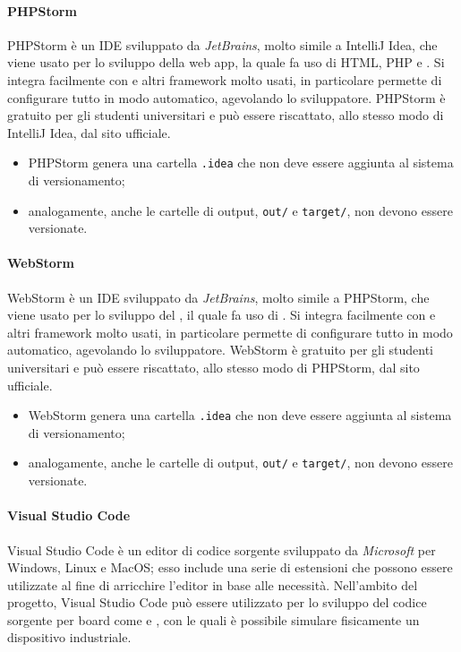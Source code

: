 				\paragraph{PHPStorm}
					PHPStorm è un IDE sviluppato da \textit{JetBrains}, molto simile a IntelliJ Idea, che viene usato per lo sviluppo della web app, la quale fa uso di HTML, PHP e .
					\newline
					Si integra facilmente con  e altri framework molto usati, in particolare permette di configurare tutto in modo automatico, agevolando lo sviluppatore.
					\newline
					PHPStorm è gratuito per gli studenti universitari e può essere riscattato, allo stesso modo di IntelliJ Idea, dal sito ufficiale.

					\begin{itemize}
						\item PHPStorm genera una cartella \verb!.idea! che non deve essere aggiunta al sistema di versionamento;
						\item analogamente, anche le cartelle di output, \verb!out/! e \verb!target/!, non devono essere versionate.
					\end{itemize}

				\paragraph{WebStorm}
					WebStorm è un IDE sviluppato da \textit{JetBrains}, molto simile a PHPStorm, che viene usato per lo sviluppo del , il quale fa uso di .
					\newline
					Si integra facilmente con  e altri framework molto usati, in particolare permette di configurare tutto in modo automatico, agevolando lo sviluppatore.
					\newline
					WebStorm è gratuito per gli studenti universitari e può essere riscattato, allo stesso modo di PHPStorm, dal sito ufficiale.

					\begin{itemize}
						\item WebStorm genera una cartella \verb!.idea! che non deve essere aggiunta al sistema di versionamento;
						\item analogamente, anche le cartelle di output, \verb!out/! e \verb!target/!, non devono essere versionate.
					\end{itemize}

				\paragraph{Visual Studio Code}
					Visual Studio Code è un editor di codice sorgente sviluppato da \textit{Microsoft} per Windows, Linux e MacOS; esso include una serie di estensioni che possono essere utilizzate al fine di arricchire l'editor in base alle necessità.
					\newline
					Nell'ambito del progetto, Visual Studio Code può essere utilizzato per lo sviluppo del codice sorgente per board come  e , con le quali è possibile simulare fisicamente un dispositivo industriale.

